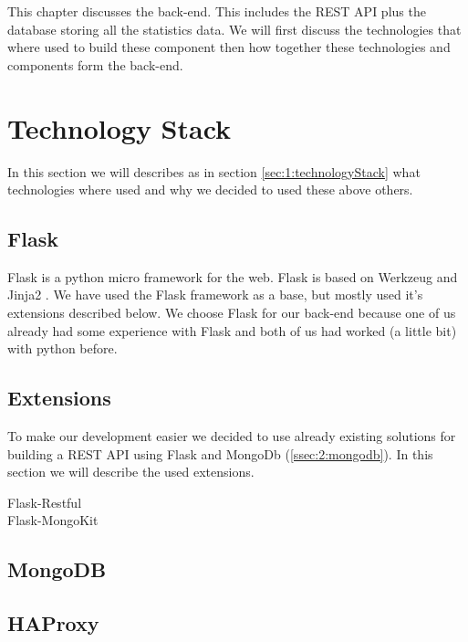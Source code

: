 
This chapter discusses the back-end. This includes the REST API plus the database storing all the statistics data. We will first discuss the technologies that where used to build these component then how together these technologies and components form the back-end.

\section{Technology Stack}
\label{sec:2:technologyStack}
In this section we will describes as in section \ref{sec:1:technologyStack} what technologies where used and why we decided to used these above others.

\subsection{Flask}
\label{ssec:2:flask}
Flask \cite{flask} is a python micro framework for the web. Flask is based on Werkzeug \cite{werkzeug} and Jinja2 \cite{jinja2}. We have used the Flask framework as a base, but mostly used it's extensions described below. We choose Flask for our back-end because one of us already had some experience with Flask and both of us had worked (a little bit) with python before.

\subsection{Extensions}
To make our development easier we decided to use already existing solutions for building a REST API using Flask and MongoDb (\autoref{ssec:2:mongodb}). In this section we will describe the used extensions.

\begin{description}

\item[Flask-Restful]
\item[Flask-MongoKit]

\end{description}

\subsection{MongoDB}
\label{ssec:2:mongodb}

\subsection{HAProxy}
\label{ssec:2:haproxy}

